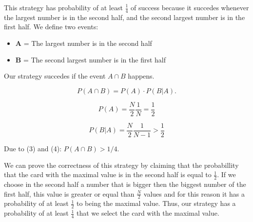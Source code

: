 \documentclass[11pt]{article}
\theoremstyle{definition}
\begin{document}
This strategy has probability of  at least $\frac{1}{4}$ of success because it succedes whenever the largest number is in the second half, and the second largest number is in the first half. 
We define two events:
\begin{itemize}
\item \textbf{A} = The largest number is in the second half
\item \textbf{B} = The second largest number is in the first half 
\end{itemize}

Our strategy succedes if the event $ A \cap B$ happens.

\begin{equation}
P(A \cap B) = P(A) \cdot P(B|A).
\end{equation}

\begin{equation}
P(A) =  \frac{N}{2}  \frac{1}{N} = \frac{1}{2} 
\end{equation}

\begin{equation}
P(B|A) =  \frac{N}{2}  \frac{1}{N-1} > \frac{1}{2}
\end{equation}

Due to (3) and (4):  $P(A \cap B) > 1/4$.


We can prove the correctness of this strategy by claiming that the probabillity that the card with the maximal value is in the second half is equal to $\frac{1}{2}$. If we choose in the second half a number that is bigger then the biggest number of the first half, this value is greater or equal than $ \frac{N}{2}$ values and for this reason it has a probability of at least $\frac{1}{2}$ to being the maximal value. Thus, our strategy has a probability of at least $\frac{1}{4}$ that we select the card with the maximal value.
\newpage
\end{document}
